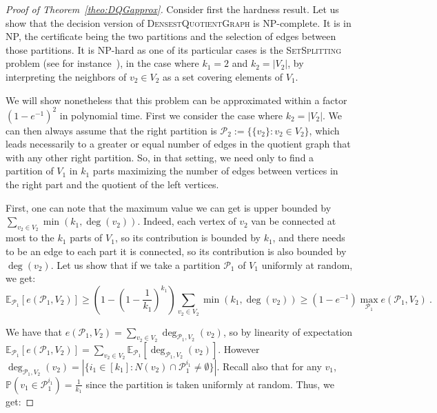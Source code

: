 \begin{proof}[Proof of Theorem~\ref{theo:DQGapprox}]
  Consider first the hardness result. Let us show that the decision version of \textsc{DensestQuotientGraph} is \textrm{NP}-complete. It is in \textrm{NP}, the certificate being the two partitions and the selection of edges between those partitions. It is \textrm{NP}-hard as one of its particular cases is the \textsc{SetSplitting} problem (see for instance~\cite{GJ79}), in the case where $k_1=2$ and $k_2=|V_2|$, by interpreting the neighbors of $v_2 \in V_2$ as a set covering elements of $V_1$.

We will show nonetheless that this problem can be approximated within a factor $(1-e^{-1})^2$ in polynomial time. First we consider the case where $k_2=|V_2|$. We can then always assume that the right partition is $\mathcal{P}_2 := \{ \{v_2\} : v_2 \in V_2 \}$, which leads necessarily to a greater or equal number of edges in the quotient graph that with any other right partition. So, in that setting, we need only to find a partition of $V_1$ in $k_1$ parts maximizing the number of edges between vertices in the right part and the quotient of the left vertices.

First, one can note that the maximum value we can get is upper bounded by $\sum_{v_2 \in V_2}\min\left(k_1,\deg(v_2)\right)$. Indeed, each vertex of $v_2$ van be connected at most to the $k_1$ parts of $V_1$, so its contribution is bounded by $k_1$, and there needs to be an edge to each part it is connected, so its contribution is also bounded by $\deg(v_2)$. Let us show that if we take a partition $\mathcal{P}_1$ of $V_1$ uniformly at random, we get:
\[ \mathbb{E}_{\mathcal{P}_1}[e(\mathcal{P}_1,V_2)] \geq \left(1-\left(1-\frac{1}{k_1}\right)^{k_1}\right)\sum_{v_2 \in V_2}\min\left(k_1,\deg(v_2)\right) \geq (1-e^{-1})\max_{\mathcal{P}_1}e(\mathcal{P}_1,V_2) \ .\]

We have that $e(\mathcal{P}_1,V_2)=\sum_{v_2 \in V_2}\deg_{\mathcal{P}_1,V_2}(v_2)$, so by linearity of expectation $\mathbb{E}_{\mathcal{P}_1}[e(\mathcal{P}_1,V_2)] = \sum_{v_2 \in V_2}\mathbb{E}_{\mathcal{P}_1}[\deg_{\mathcal{P}_1,V_2}(v_2)]$. However $\deg_{\mathcal{P}_1,V_2}(v_2)=|\{i_1 \in [k_1]: N(v_2) \cap \mathcal{P}_1^{i_1} \not= \emptyset  \}|$. Recall also that for any $v_1$, $\mathbb{P}\left(v_1 \in \mathcal{P}_1^{i_1}\right) = \frac{1}{k_1}$ since the partition is taken uniformly at random. Thus, we get:


\end{proof}
